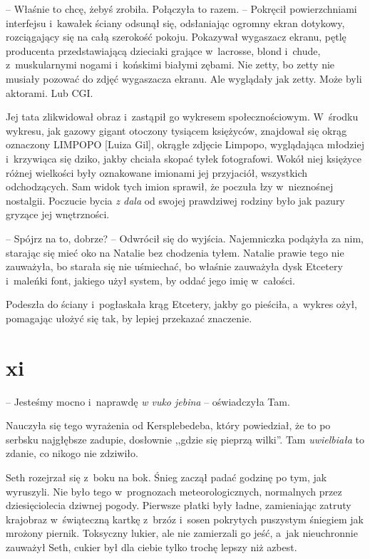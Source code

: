 \documentclass[oneside,polish,11pt,sfheadings]{mwbk}
\begin{document}
-- Właśnie to chcę, żebyś zrobiła. Połączyła to razem. -- Pokręcił
powierzchniami interfejsu i~kawałek ściany odsunął się, odsłaniając
ogromny ekran dotykowy, rozciągający się na całą szerokość pokoju.
Pokazywał wygaszacz ekranu, pętlę producenta przedstawiającą dzieciaki
grające w~lacrosse, blond i~chude, z~muskularnymi nogami i~końskimi
białymi zębami. Nie zetty, bo zetty nie musiały pozować do zdjęć
wygaszacza ekranu. Ale wyglądały jak zetty. Może byli aktorami. Lub CGI.

Jej tata zlikwidował obraz i~zastąpił go wykresem społecznościowym. W~środku wykresu, jak gazowy gigant otoczony tysiącem księżyców, znajdował
się okrąg oznaczony LIMPOPO {[}Luiza Gil{]}, okrągłe zdjęcie Limpopo,
wyglądająca młodziej i~krzywiąca się dziko, jakby chciała skopać tyłek
fotografowi. Wokół niej księżyce różnej wielkości były oznakowane
imionami jej przyjaciół, wszystkich odchodzących. Sam widok tych imion
sprawił, że poczuła łzy w~nieznośnej nostalgii. Poczucie bycia \textit{z
dala} od swojej prawdziwej rodziny było jak pazury gryzące jej
wnętrzności.

-- Spójrz na to, dobrze? -- Odwrócił się do wyjścia. Najemniczka podążyła
za nim, starając się mieć oko na Natalie bez chodzenia tyłem. Natalie
prawie tego nie zauważyła, bo starała się nie uśmiechać, bo właśnie
zauważyła dysk Etcetery i~maleńki font, jakiego użył system, by oddać
jego imię w~całości.

Podeszła do ściany i~pogłaskała krąg Etcetery, jakby go pieściła, a~wykres ożył, pomagając ułożyć się tak, by lepiej przekazać znaczenie.

\chapter*{xi}

-- Jesteśmy mocno i~naprawdę \textit{w vuko jebina} -- oświadczyła Tam.

Nauczyła się tego wyrażenia od Kersplebedeba, który powiedział, że to po
serbsku najgłębsze zadupie, dosłownie ,,gdzie się pieprzą wilki''. Tam
\textit{uwielbiała} to zdanie, co nikogo nie zdziwiło.

Seth rozejrzał się z~boku na bok. Śnieg zaczął padać godzinę po tym, jak
wyruszyli. Nie było tego w~prognozach meteorologicznych, normalnych
przez dziesięciolecia dziwnej pogody. Pierwsze płatki były ładne,
zamieniając zatruty krajobraz w~świąteczną kartkę z~brzóz i~sosen
pokrytych puszystym śniegiem jak mrożony piernik. Toksyczny lukier, ale
nie zamierzali go jeść, a~jak nieuchronnie zauważył Seth, cukier był dla
ciebie tylko trochę lepszy niż azbest.
\end{document}
